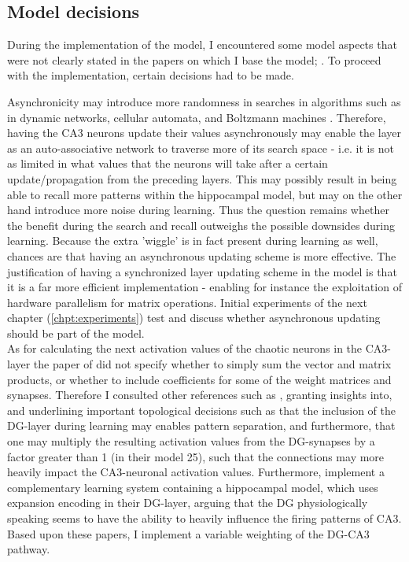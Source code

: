 \subsection{Model decisions}

During the implementation of the model, I encountered some model aspects that were not clearly stated in the papers on which I base the model; \citep{Hattori2014, Hattori2010}. To proceed with the implementation, certain decisions had to be made.

Asynchronicity may introduce more randomness in searches in algorithms such as in dynamic networks, cellular automata, and Boltzmann machines \citep{Bar-yam1997}. Therefore, having the CA3 neurons update their values asynchronously may enable the layer as an auto-associative network to traverse more of its search space - i.e. it is not as limited in what values that the neurons will take after a certain update/propagation from the preceding layers. This may possibly result in being able to recall more patterns within the hippocampal model, but may on the other hand introduce more noise during learning. Thus the question remains whether the benefit during the search and recall outweighs the possible downsides during learning. Because the extra 'wiggle' is in fact present during learning as well, chances are that having an asynchronous updating scheme is more effective.
The justification of having a synchronized layer updating scheme in the model is that it is a far more efficient implementation - enabling for instance the exploitation of hardware parallelism for matrix operations. Initial experiments of the next chapter (\ref{chpt:experiments}) test and discuss whether asynchronous updating should be part of the model.
\\

As for calculating the next activation values of the chaotic neurons in the CA3-layer the paper of \cite{Hattori2014} did not specify whether to simply sum the vector and matrix products, or whether to include coefficients for some of the weight matrices and synapses. Therefore I consulted other references such as \citep{Wakagi2008}, granting insights into, and underlining important topological decisions such as that the inclusion of the DG-layer during learning may enables pattern separation, and furthermore, that one may multiply the resulting activation values from the DG-synapses by a factor greater than 1 (in their model 25), such that the connections may more heavily impact the CA3-neuronal activation values.
Furthermore, \cite{Norman2003} implement a complementary learning system containing a hippocampal model, which uses expansion encoding in their DG-layer, arguing that the DG physiologically speaking seems to have the ability to heavily influence the firing patterns of CA3. 
Based upon these papers, I implement a variable weighting of the DG-CA3 pathway. 

